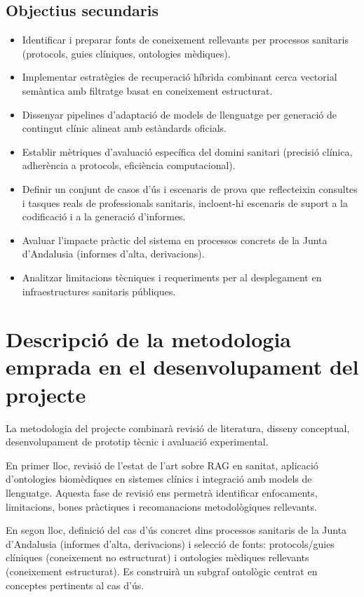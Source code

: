 \documentclass[11pt,a4paper]{article}
\begin{document}
\subsection*{Objectius secundaris}
\begin{itemize}
\item Identificar i preparar fonts de coneixement rellevants per processos sanitaris (protocols, guies clíniques, ontologies mèdiques).
\item Implementar estratègies de recuperació híbrida combinant cerca vectorial semàntica amb filtratge basat en coneixement estructurat.
\item Dissenyar pipelines d'adaptació de models de llenguatge per generació de contingut clínic alineat amb estàndards oficials.
\item Establir mètriques d'avaluació específica del domini sanitari (precisió clínica, adherència a protocols, eficiència computacional).
\item Definir un conjunt de casos d'ús i escenaris de prova que reflecteixin consultes i tasques reals de professionals sanitaris, incloent-hi escenaris de suport a la codificació i a la generació d'informes.
\item Avaluar l'impacte pràctic del sistema en processos concrets de la Junta d'Andalusia (informes d'alta, derivacions).
\item Analitzar limitacions tècniques i requeriments per al desplegament en infraestructures sanitaris públiques.
\end{itemize}



\section*{Descripció de la metodologia emprada en el desenvolupament del projecte}
La metodologia del projecte combinarà revisió de literatura, disseny conceptual, desenvolupament de prototip tècnic i avaluació experimental.

En primer lloc, revisió de l'estat de l'art sobre RAG en sanitat, aplicació d'ontologies biomèdiques en sistemes clínics i integració amb models de llenguatge. Aquesta fase de revisió ens permetrà identificar enfocaments, limitacions, bones pràctiques i recomanacions metodològiques rellevants.

En segon lloc, definició del cas d'ús concret dins processos sanitaris de la Junta d'Andalusia (informes d'alta, derivacions) i selecció de fonts: protocols/guies clíniques (coneixement no estructurat) i ontologies mèdiques rellevants (coneixement estructurat). Es construirà un subgraf ontològic centrat en conceptes pertinents al cas d'ús.
\end{document}
